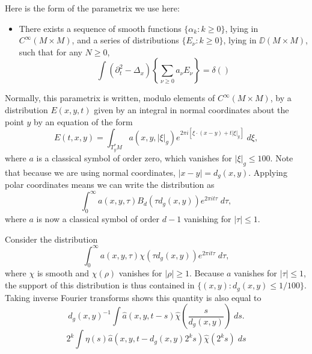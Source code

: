 Here is the form of the parametrix we use here:
%
\begin{itemize}
    \item There exists a sequence of smooth functions $\{ \alpha_k : k \geq 0 \}$, lying in $C^\infty(M \times M)$, and a series of distributions $\{ E_\nu : k \geq 0 \}$, lying in $\DD(M \times M)$, such that for any $N \geq 0$,
    \[ \int (\partial_t^2 - \Delta_x) \left\{ \sum_{\nu \geq 0} a_\nu E_\nu \right\} = \delta(  ) \]
\end{itemize}


Normally, this parametrix is written, modulo elements of $C^\infty(M \times M)$, by a distribution $E(x,y,t)$ given by an integral in normal coordinates about the point $y$ by an equation of the form
%
\[ E(t,x,y) = \int_{T^*_y M} a(x,y, |\xi|_g ) e^{2 \pi i [ \xi \cdot (x - y) + t |\xi|_g ]}\; d\xi, \]
%
where $a$ is a classical symbol of order zero, which vanishes for $|\xi|_g \leq 100$. Note that because we are using normal coordinates, $|x - y| = d_g(x,y)$.
%
%
Applying polar coordinates means we can write the distribution as
%
\[ \int_0^\infty a(x,y,\tau) B_d(\tau d_g(x,y)) e^{2 \pi i t \tau}\; d\tau, \]
%
where $a$ is now a classical symbol of order $d-1$ vanishing for $|\tau| \leq 1$.

Consider the distribution
%
\[ \int_0^\infty a(x,y,\tau) \chi(\tau d_g(x,y)) e^{2 \pi i t \tau}\; d\tau, \]
%
where $\chi$ is smooth and $\chi(\rho)$ vanishes for $|\rho| \geq 1$. Because $a$ vanishes for $|\tau| \leq 1$, the support of this distribution is thus contained in $\{ (x,y): d_g(x,y) \leq 1/100 \}$. Taking inverse Fourier transforms shows this quantity is also equal to
%
\[ d_g(x,y)^{-1} \int \widehat{a}(x,y, t - s ) \widehat{\chi} \left( \frac{s}{d_g(x,y)} \right)\; ds. \]
%
\[ 2^k  \int \eta( s ) \widehat{a}(x,y, t - d_g(x,y) 2^k s) \widehat{\chi}(2^k s)\; ds \]

